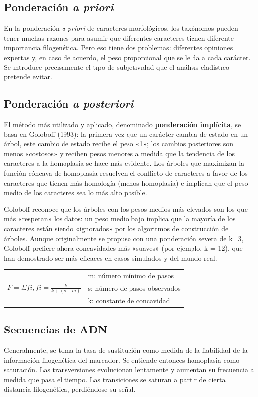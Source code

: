 \subsection{Ponderación \textit{a priori}}
En la ponderación \textit{a priori} de caracteres morfológicos, los taxónomos pueden tener muchas razones para asumir que diferentes caracteres tienen diferente importancia filogenética. Pero eso tiene dos problemas: diferentes opiniones expertas y, en caso de acuerdo, el peso proporcional que se le da a cada carácter. Se introduce precisamente el tipo de subjetividad que el análisis cladístico pretende evitar.

\subsection{Ponderación \textit{a posteriori}}
El método más utilizado y aplicado, denominado \textbf{ponderación implícita}, se basa en Goloboff (1993): la primera vez que un carácter cambia de estado en un árbol, este cambio de estado recibe el peso «1»; los cambios posteriores son menos «costosos» y reciben pesos menores a medida que la tendencia de los caracteres a la homoplasia se hace más evidente. Los árboles que maximizan la función cóncava de homoplasia resuelven el conflicto de caracteres a favor de los caracteres que tienen más homología (menos homoplasia) e implican que el peso medio de los caracteres sea lo más alto posible.

Goloboff reconoce que los árboles con los pesos medios más elevados son los que más «respetan» los datos: un peso medio bajo implica que la mayoría de los caracteres están siendo «ignorados» por los algoritmos de construcción de árboles. Aunque originalmente se propuso con una ponderación severa de k=3, Goloboff prefiere ahora concavidades más «suaves» (por ejemplo, k = 12), que han demostrado ser más eficaces en casos simulados y del mundo real.

\begin{center}
\begin{tabular}{l l}
\multirow{3}{12em}{$F = \Sigma fi, fi = \frac{k}{k+(s-m)} $} & m: número mínimo de pasos \\ 
 & s: número de pasos observados \\
 & k: constante de concavidad
\end{tabular}
\end{center}

\subsection{Secuencias de ADN}
 Generalmente, se toma la tasa de sustitución como medida de la fiabilidad de la información filogenética del marcador. Se entiende entonces homoplasia como saturación. Las transversiones evolucionan lentamente y aumentan su frecuencia a medida que pasa el tiempo. Las transiciones se saturan a partir de cierta distancia filogenética, perdiéndose su señal. 
 

